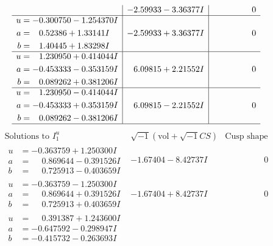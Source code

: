 \documentclass[1p]{elsarticle_modified}
\theoremstyle{definition}
\newcommand{\I}{\sqrt{-1}}
\begin{document}
$$\begin{array}{c|c|c}
 & -2.59933 - 3.36377 I & \phantom{-0.000000 } 0 \\ \hline\begin{aligned}
u &= -0.300750 - 1.254370 I \\
a &= \phantom{-}0.52386 + 1.33141 I \\
b &= \phantom{-}1.40445 + 1.83298 I\end{aligned}
 & -2.59933 + 3.36377 I & \phantom{-0.000000 } 0 \\ \hline\begin{aligned}
u &= \phantom{-}1.230950 + 0.414044 I \\
a &= -0.453333 - 0.353159 I \\
b &= \phantom{-}0.089262 + 0.381206 I\end{aligned}
 & \phantom{-}6.09815 + 2.21552 I & \phantom{-0.000000 } 0 \\ \hline\begin{aligned}
u &= \phantom{-}1.230950 - 0.414044 I \\
a &= -0.453333 + 0.353159 I \\
b &= \phantom{-}0.089262 - 0.381206 I\end{aligned}
 & \phantom{-}6.09815 - 2.21552 I & \phantom{-0.000000 } 0\\
 \hline 
 \end{array}$$\newpage$$\begin{array}{c|c|c}  
\text{Solutions to }I^u_{1}& \I (\text{vol} + \sqrt{-1}CS) & \text{Cusp shape}\\
 \hline 
\begin{aligned}
u &= -0.363759 + 1.250300 I \\
a &= \phantom{-}0.869644 - 0.391526 I \\
b &= \phantom{-}0.725913 - 0.403659 I\end{aligned}
 & -1.67404 - 8.42737 I & \phantom{-0.000000 } 0 \\ \hline\begin{aligned}
u &= -0.363759 - 1.250300 I \\
a &= \phantom{-}0.869644 + 0.391526 I \\
b &= \phantom{-}0.725913 + 0.403659 I\end{aligned}
 & -1.67404 + 8.42737 I & \phantom{-0.000000 } 0 \\ \hline\begin{aligned}
u &= \phantom{-}0.391387 + 1.243600 I \\
a &= -0.647592 - 0.298947 I \\
b &= -0.415732 - 0.263693 I\end{aligned}

\end{array}$$
\end{document}
